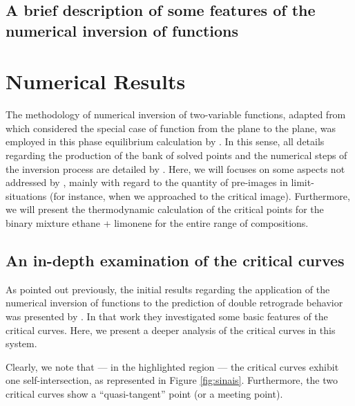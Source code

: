 \documentclass{article}
\theoremstyle{definition}
\theoremstyle{remark}
\begin{document}
\subsection{A brief description of some features of the numerical 
inversion of functions}

\section{Numerical Results}

The methodology of numerical inversion of two-variable functions,
adapted from \cite{malta} which considered the special case 
of function from the plane to the plane,
 was employed in this phase equilibrium calculation by \cite{ireme}. In this sense, all details regarding the production of the bank of solved points and the numerical steps of the inversion process are detailed by \cite{ireme}. Here, we will focuses on some aspects not addressed by \cite{ireme}, mainly with regard
 to the quantity of pre-images in  limit-situations (for instance, when we approached to the critical image). Furthermore, we will present the thermodynamic calculation of the critical points for the binary mixture ethane + limonene for the entire range of compositions.

\subsection{An in-depth examination of the critical curves}

As pointed out previously, the initial results regarding the 
application of the numerical inversion of functions to the prediction 
of double retrograde behavior was presented by \cite{ireme}. In that 
work they investigated some basic features of the critical 
curves. Here, we present a deeper analysis of the critical 
curves in this system.

Clearly, we note that --- in the highlighted region --- the critical 
curves exhibit one self-intersection, as represented in 
Figure \ref{fig:sinais}. Furthermore, the two critical curves 
show a ``quasi-tangent'' point (or a meeting point).
\end{document}
